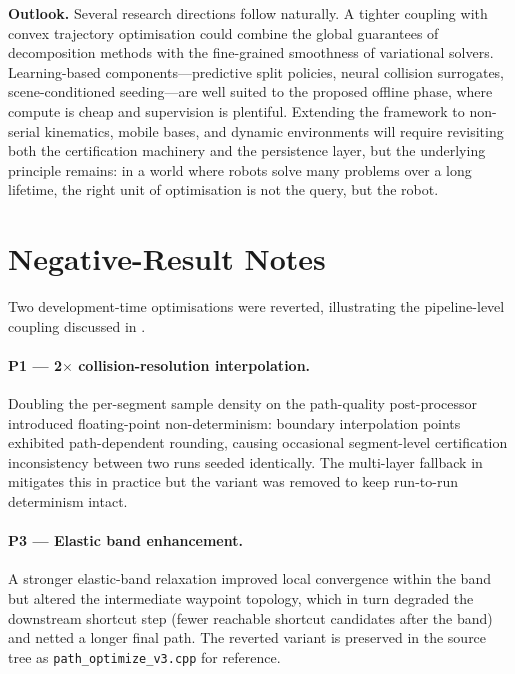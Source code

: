 \documentclass[journal]{IEEEtran}
\begin{document}
\textbf{Outlook.}
Several research directions follow naturally.
A tighter coupling with convex trajectory optimisation could combine
the global guarantees of decomposition methods with the
fine-grained smoothness of variational solvers.
Learning-based components---predictive split policies, neural
collision surrogates, scene-conditioned seeding---are well suited to
the proposed offline phase, where compute is cheap and supervision
is plentiful.
Extending the framework to non-serial kinematics, mobile bases, and
dynamic environments will require revisiting both the certification
machinery and the persistence layer, but the underlying principle
remains: in a world where robots solve many problems over a long
lifetime, the right unit of optimisation is not the query, but the
robot.

\appendices

\section{Negative-Result Notes}\label{app:negative_results}

Two development-time optimisations were reverted, illustrating the
pipeline-level coupling discussed in .

\paragraph{P1 — 2$\times$ collision-resolution interpolation.}
Doubling the per-segment sample density on the path-quality
post-processor introduced floating-point non-determinism: boundary
interpolation points exhibited path-dependent rounding, causing
occasional segment-level certification inconsistency between two runs
seeded identically. The multi-layer fallback in
 mitigates this in practice but the variant was
removed to keep run-to-run determinism intact.

\paragraph{P3 — Elastic band enhancement.}
A stronger elastic-band relaxation improved local convergence within
the band but altered the intermediate waypoint topology, which in turn
degraded the downstream shortcut step (fewer reachable shortcut
candidates after the band) and netted a longer final path. The
reverted variant is preserved in the source tree as
\texttt{path\_optimize\_v3.cpp} for reference.
\end{document}
